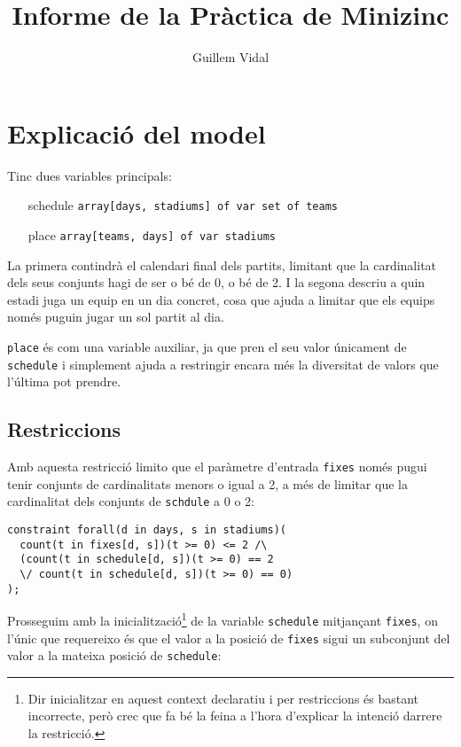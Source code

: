 \documentclass{article}
\begin{document}
\title{Informe de la Pràctica de Minizinc}
\author{Guillem Vidal}
\maketitle

\section{Explicació del model}

Tinc dues variables principals:

\begin{itemize}
	\item[schedule] \texttt{array[days, stadiums] of var set of teams}
	\item[place] \texttt{array[teams, days] of var stadiums}
\end{itemize}

La primera contindrà el calendari final dels partits, limitant que la
cardinalitat dels seus conjunts hagi de ser o bé de 0, o bé de 2. I la segona
descriu a quin estadi juga un equip en un dia concret, cosa que ajuda a limitar
que els equips només puguin jugar un sol partit al dia.

\texttt{place} és com una variable auxiliar, ja que pren el seu valor únicament
de \texttt{schedule} i simplement ajuda a restringir encara més la diversitat de
valors que l'última pot prendre.

\subsection{Restriccions}

Amb aquesta restricció limito que el paràmetre d'entrada \texttt{fixes} només
pugui tenir conjunts de cardinalitats menors o igual a 2, a més de limitar que
la cardinalitat dels conjunts de \texttt{schdule} a 0 o 2:

\begin{verbatim}
constraint forall(d in days, s in stadiums)(
  count(t in fixes[d, s])(t >= 0) <= 2 /\
  (count(t in schedule[d, s])(t >= 0) == 2
  \/ count(t in schedule[d, s])(t >= 0) == 0)
);
\end{verbatim}


Prosseguim amb la inicialització\footnote{Dir inicialitzar en aquest context
declaratiu i per restriccions és bastant incorrecte, però crec que fa bé la
feina a l'hora d'explicar la intenció darrere la restricció.} de la variable
\texttt{schedule} mitjançant \texttt{fixes}, on l'únic que requereixo és que el
valor a la posició de \texttt{fixes} sigui un subconjunt del valor a la mateixa
posició de \texttt{schedule}:
\end{document}
